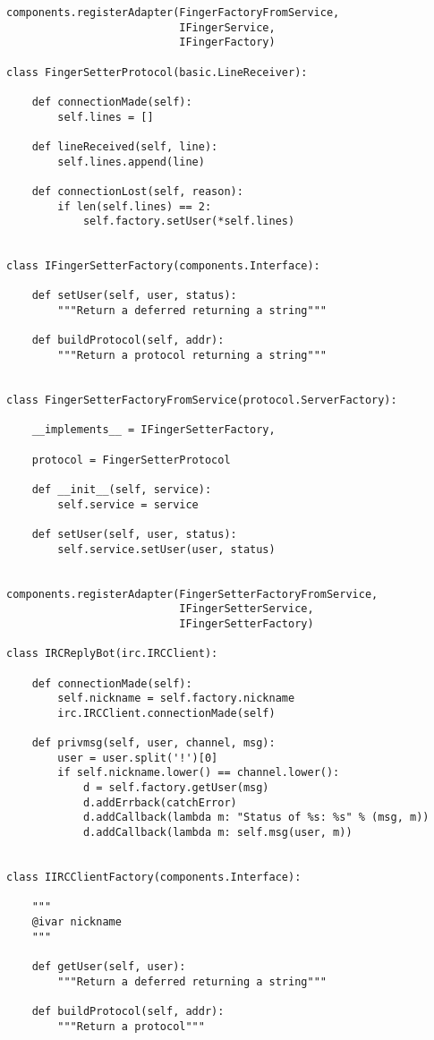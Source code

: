 \begin{verbatim}
components.registerAdapter(FingerFactoryFromService,
                           IFingerService,
                           IFingerFactory)

class FingerSetterProtocol(basic.LineReceiver):

    def connectionMade(self):
        self.lines = []

    def lineReceived(self, line):
        self.lines.append(line)

    def connectionLost(self, reason):
        if len(self.lines) == 2:
            self.factory.setUser(*self.lines)


class IFingerSetterFactory(components.Interface):

    def setUser(self, user, status):
        """Return a deferred returning a string"""

    def buildProtocol(self, addr):
        """Return a protocol returning a string"""


class FingerSetterFactoryFromService(protocol.ServerFactory):

    __implements__ = IFingerSetterFactory,

    protocol = FingerSetterProtocol

    def __init__(self, service):
        self.service = service

    def setUser(self, user, status):
        self.service.setUser(user, status)


components.registerAdapter(FingerSetterFactoryFromService,
                           IFingerSetterService,
                           IFingerSetterFactory)

class IRCReplyBot(irc.IRCClient):

    def connectionMade(self):
        self.nickname = self.factory.nickname
        irc.IRCClient.connectionMade(self)

    def privmsg(self, user, channel, msg):
        user = user.split('!')[0]
        if self.nickname.lower() == channel.lower():
            d = self.factory.getUser(msg)
            d.addErrback(catchError)
            d.addCallback(lambda m: "Status of %s: %s" % (msg, m))
            d.addCallback(lambda m: self.msg(user, m))


class IIRCClientFactory(components.Interface):

    """
    @ivar nickname
    """

    def getUser(self, user):
        """Return a deferred returning a string"""

    def buildProtocol(self, addr):
        """Return a protocol"""



\end{verbatim}
